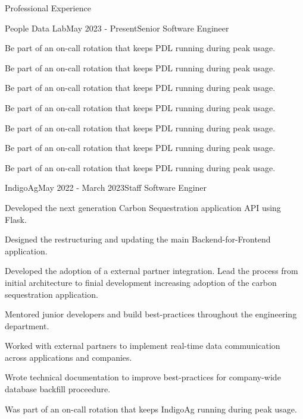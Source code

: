 \documentclass{bluefin_cv}
\begin{document}
\begin{bfcvSection}{Professional Experience}

\begin{bfcvWorkSubsection}{People Data Lab}{May 2023 - Present}{Senior Software Engineer}
\item Be part of an on-call rotation that keeps PDL running during peak usage.
\item Be part of an on-call rotation that keeps PDL running during peak usage.
\item Be part of an on-call rotation that keeps PDL running during peak usage.
\item Be part of an on-call rotation that keeps PDL running during peak usage.
\item Be part of an on-call rotation that keeps PDL running during peak usage.
\item Be part of an on-call rotation that keeps PDL running during peak usage.
\item Be part of an on-call rotation that keeps PDL running during peak usage.
\end{bfcvWorkSubsection}

\begin{bfcvWorkSubsection}{IndigoAg}{May 2022 - March 2023}{Staff Software Enginer}
\item Developed the next generation Carbon Sequestration application API using Flask.
\item Designed the restructuring and updating the main Backend-for-Frontend application.
\item Developed the adoption of a external partner integration. Lead the process from initial architecture to finial development increasing adoption of the carbon sequestration application.
\item Mentored junior developers and build best-practices throughout the engineering department.
\item Worked with external partners to implement real-time data communication across applications and companies.
\item Wrote technical documentation to improve best-practices for company-wide database backfill proceedure.
\item Was part of an on-call rotation that keeps IndigoAg running during peak usage.
\end{bfcvWorkSubsection}


\end{bfcvSection}
\end{document}
